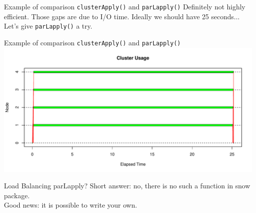 \documentclass[aspectratio=169]{beamer}\usepackage[]{graphicx}\usepackage[]{color}
\newenvironment{knitrout}{}{} %
\begin{document}
\begin{frame}[fragile]{Example of comparison \texttt{clusterApply()} and \texttt{parLapply()}}
  Definitely not highly efficient. Those gaps are due to I/O time.
  Ideally we should have 25 seconds... Let's give \texttt{parLapply()} a try.
\end{frame}

\begin{frame}[fragile]{Example of comparison \texttt{clusterApply()} and \texttt{parLapply()}}
\begin{knitrout}\tiny
{}\color{fgcolor}
\includegraphics[width=.89\linewidth]{figure/unnamed-chunk-16-1} 

\end{knitrout}

\end{frame}

\begin{frame}[fragile]{Load Balancing parLapply?}
  \pause
  Short answer: no, there is no such a function in snow package. \\
  Good news: it is possible to write your own.
\end{frame}
\end{document}
